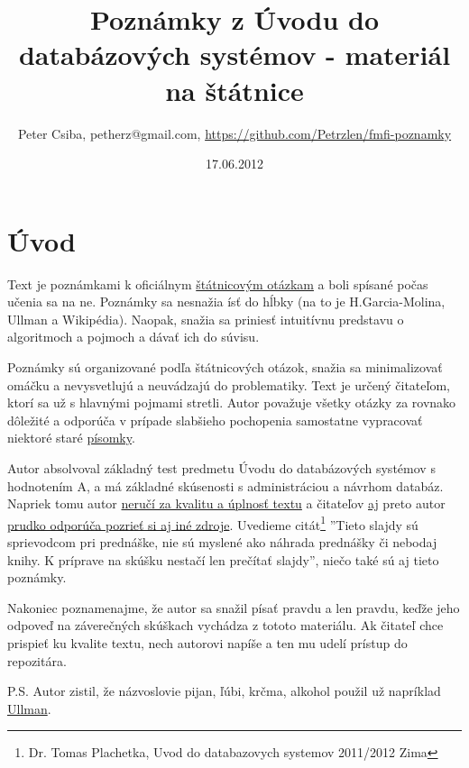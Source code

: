 \documentclass[10pt,a4paper]{article}
\title{Poznámky z Úvodu do databázových systémov - materiál na štátnice}
\date{17.06.2012}
\author{Peter Csiba, petherz@gmail.com, \url{https://github.com/Petrzlen/fmfi-poznamky}}
\begin{document}
\maketitle
\tableofcontents

\clearpage

\section*{Úvod}   

Text je poznámkami k oficiálnym \href{http://new.dcs.fmph.uniba.sk/index.php/Studium/Bakalarske/StatneSkusky}{štátnicovým otázkam} a boli spísané počas učenia sa na ne.
Poznámky sa nesnažia ísť do hĺbky (na to je H.Garcia-Molina, Ullman a Wikipédia).
Naopak, snažia sa priniesť intuitívnu predstavu o algoritmoch a pojmoch a dávať ich do súvisu.

Poznámky sú organizované podľa štátnicových otázok, snažia sa minimalizovať omáčku a nevysvetlujú a neuvádzajú do problematiky. Text je určený čitateľom, ktorí sa už s hlavnými pojmami stretli.
Autor považuje všetky otázky za rovnako dôležité a odporúča v prípade slabšieho pochopenia samostatne vypracovať niektoré staré \href{http://www.dcs.fmph.uniba.sk/~plachetk/TEACHING/DB2011/index.html}{písomky}.

Autor absolvoval základný test predmetu Úvodu do databázových systémov s hodnotením A, a má základné skúsenosti s administráciou a návrhom databáz. Napriek tomu autor \underline{neručí za kvalitu a úplnosť textu} a čitateľov \underline{aj} preto autor \underline{prudko odporúča pozrieť si aj iné zdroje}. Uvedieme citát\footnote{Dr. Tomas Plachetka, Uvod do databazovych systemov 2011/2012 Zima} ''Tieto slajdy sú sprievodcom pri prednáške, nie sú myslené ako náhrada
prednášky či nebodaj knihy. K príprave na skúšku nestačí len prečítať slajdy'', niečo také sú aj tieto poznámky.  

Nakoniec poznamenajme, že autor sa snažil písať pravdu a len pravdu, keďže jeho odpoveď na záverečných skúškach vychádza z tototo materiálu.
Ak čitateľ chce prispieť ku kvalite textu, nech autorovi napíše a ten mu udelí prístup do repozitára.

P.S. Autor zistil, že názvoslovie pijan, ľúbi, krčma, alkohol použil už napríklad \href{http://csip.sk/uploads/ullman.pdf}{Ullman}.

\end{document}
